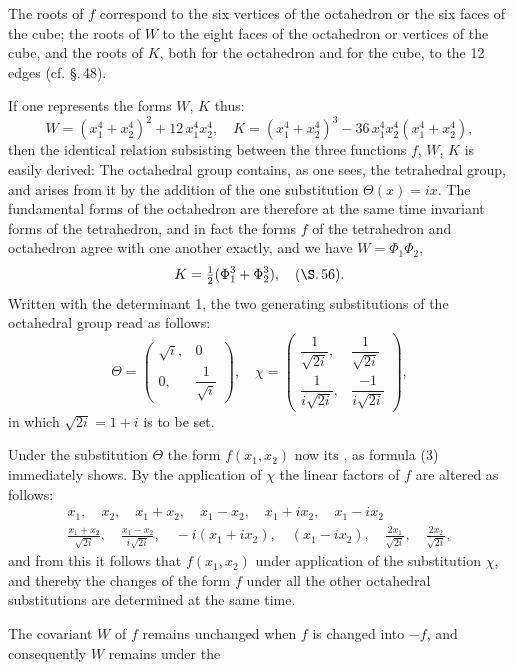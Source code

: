 
The roots of $f$ correspond to the six vertices of the octahedron or
the six faces of the cube; the roots of $W$ to the eight faces of the octahedron
or vertices of the cube, and the roots of $K$, both for the octahedron
and for the cube, to the 12 edges (cf. \S.\,48).

If one represents the forms $W$, $K$ thus:
\[
W = (x_1^4 + x_2^4)^2 + 12\,x_1^4x_2^4, \quad K = (x_1^4 + x_2^4)^3 - 36\,x_1^4x_2^4(x_1^4 + x_2^4),
\]
then the identical relation subsisting between the three functions $f$, $W$, $K$
is easily derived:
The octahedral group contains, as one sees, the tetrahedral group,
and arises from it by the addition of the one substitution
 $\Theta(x) = ix$. The fundamental forms of the octahedron are therefore
at the same time invariant forms of the tetrahedron, and in fact
the forms $f$ of the tetrahedron and octahedron agree with one another
 exactly, and we have $W = \Phi_1\Phi_2$,
\[
K = \tfrac{1}{2}(\Phi_1^3 + \Phi_2^3), \quad (\S.\,56).
\]
Written with the determinant 1, the two generating
 substitutions of the octahedral group read as follows:
\[
\Theta = \begin{pmatrix} \sqrt{i}, & 0 \\ 0, & \dfrac{1}{\sqrt{i}} \end{pmatrix}, \quad
\chi = \begin{pmatrix} \dfrac{1}{\sqrt{2i}}, & \dfrac{1}{\sqrt{2i}} \\[6pt] \dfrac{1}{i\sqrt{2i}}, & \dfrac{-1}{i\sqrt{2i}} \end{pmatrix},
\]
in which $\sqrt{2i} = 1 + i$ is to be set.

Under the substitution $\Theta$ the form $f(x_1, x_2)$ now 
its , as formula (3) immediately shows. By the
application of $\chi$ the linear factors of $f$ are altered as
 follows:
\[
\begin{gathered}
x_1, \quad x_2, \quad x_1 + x_2, \quad x_1 - x_2, \quad x_1 + ix_2, \quad x_1 - ix_2 \\
\frac{x_1 + x_2}{\sqrt{2i}}, \quad \frac{x_1 - x_2}{i\sqrt{2i}}, \quad -i(x_1 + ix_2), \quad (x_1 - ix_2), \quad \frac{2x_1}{\sqrt{2i}}, \quad \frac{2x_2}{\sqrt{2i}},
\end{gathered}
\]
and from this it follows that $f(x_1, x_2)$  under
application of the substitution $\chi$, and thereby the
changes of the form $f$ under all the other octahedral substitutions
 are determined at the same time.

The  covariant $W$ of $f$ remains unchanged
when $f$ is changed into $-f$, and consequently $W$ remains under the
